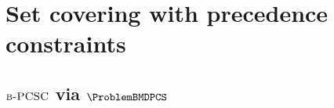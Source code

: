 

\section{Set covering with precedence constraints} \label{ea:sec:SC}


\subsection{$\textup{\textsc{b-PCSC}}$ via $\ProblemBMDPCS$} \label{ea:subsection:BPCSC}

